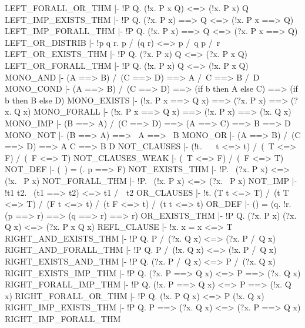 \ENDTHEOREM
\THEOREM LEFT\_FORALL\_OR\_THM
  |- !P Q. (!x. P x \/ Q) <=> (!x. P x) \/ Q
\ENDTHEOREM
\THEOREM LEFT\_IMP\_EXISTS\_THM
  |- !P Q. (?x. P x) ==> Q <=> (!x. P x ==> Q)
\ENDTHEOREM
\THEOREM LEFT\_IMP\_FORALL\_THM
  |- !P Q. (!x. P x) ==> Q <=> (?x. P x ==> Q)
\ENDTHEOREM
\THEOREM LEFT\_OR\_DISTRIB
  |- !p q r. p /\ (q \/ r) <=> p /\ q \/ p /\ r
\ENDTHEOREM
\THEOREM LEFT\_OR\_EXISTS\_THM
  |- !P Q. (?x. P x) \/ Q <=> (?x. P x \/ Q)
\ENDTHEOREM
\THEOREM LEFT\_OR\_FORALL\_THM
  |- !P Q. (!x. P x) \/ Q <=> (!x. P x \/ Q)
\ENDTHEOREM
\THEOREM MONO\_AND
  |- (A ==> B) /\ (C ==> D) ==> A /\ C ==> B /\ D
\ENDTHEOREM
\THEOREM MONO\_COND
  |- (A ==> B) /\ (C ==> D) ==> (if b then A else C) ==> (if b then B else D)
\ENDTHEOREM
\THEOREM MONO\_EXISTS
  |- (!x. P x ==> Q x) ==> (?x. P x) ==> (?x. Q x)
\ENDTHEOREM
\THEOREM MONO\_FORALL
  |- (!x. P x ==> Q x) ==> (!x. P x) ==> (!x. Q x)
\ENDTHEOREM
\THEOREM MONO\_IMP
  |- (B ==> A) /\ (C ==> D) ==> (A ==> C) ==> B ==> D
\ENDTHEOREM
\THEOREM MONO\_NOT
  |- (B ==> A) ==> ~A ==> ~B
\ENDTHEOREM
\THEOREM MONO\_OR
  |- (A ==> B) /\ (C ==> D) ==> A \/ C ==> B \/ D
\ENDTHEOREM
\THEOREM NOT\_CLAUSES
  |- (!t. ~ ~t <=> t) /\ (~T <=> F) /\ (~F <=> T)
\ENDTHEOREM
\THEOREM NOT\_CLAUSES\_WEAK
  |- (~T <=> F) /\ (~F <=> T)
\ENDTHEOREM
\THEOREM NOT\_DEF
  |- (~) = (\p. p ==> F)
\ENDTHEOREM
\THEOREM NOT\_EXISTS\_THM
  |- !P. ~(?x. P x) <=> (!x. ~P x)
\ENDTHEOREM
\THEOREM NOT\_FORALL\_THM
  |- !P. ~(!x. P x) <=> (?x. ~P x)
\ENDTHEOREM
\THEOREM NOT\_IMP
  |- !t1 t2. ~(t1 ==> t2) <=> t1 /\ ~t2
\ENDTHEOREM
\THEOREM OR\_CLAUSES
  |- !t. (T \/ t <=> T) /\
         (t \/ T <=> T) /\
         (F \/ t <=> t) /\
         (t \/ F <=> t) /\
         (t \/ t <=> t)
\ENDTHEOREM
\THEOREM OR\_DEF
  |- (\/) = (\p q. !r. (p ==> r) ==> (q ==> r) ==> r)
\ENDTHEOREM
\THEOREM OR\_EXISTS\_THM
  |- !P Q. (?x. P x) \/ (?x. Q x) <=> (?x. P x \/ Q x)
\ENDTHEOREM
\THEOREM REFL\_CLAUSE
  |- !x. x = x <=> T
\ENDTHEOREM
\THEOREM RIGHT\_AND\_EXISTS\_THM
  |- !P Q. P /\ (?x. Q x) <=> (?x. P /\ Q x)
\ENDTHEOREM
\THEOREM RIGHT\_AND\_FORALL\_THM
  |- !P Q. P /\ (!x. Q x) <=> (!x. P /\ Q x)
\ENDTHEOREM
\THEOREM RIGHT\_EXISTS\_AND\_THM
  |- !P Q. (?x. P /\ Q x) <=> P /\ (?x. Q x)
\ENDTHEOREM
\THEOREM RIGHT\_EXISTS\_IMP\_THM
  |- !P Q. (?x. P ==> Q x) <=> P ==> (?x. Q x)
\ENDTHEOREM
\THEOREM RIGHT\_FORALL\_IMP\_THM
  |- !P Q. (!x. P ==> Q x) <=> P ==> (!x. Q x)
\ENDTHEOREM
\THEOREM RIGHT\_FORALL\_OR\_THM
  |- !P Q. (!x. P \/ Q x) <=> P \/ (!x. Q x)
\ENDTHEOREM
\THEOREM RIGHT\_IMP\_EXISTS\_THM
  |- !P Q. P ==> (?x. Q x) <=> (?x. P ==> Q x)
\ENDTHEOREM
\THEOREM RIGHT\_IMP\_FORALL\_THM
